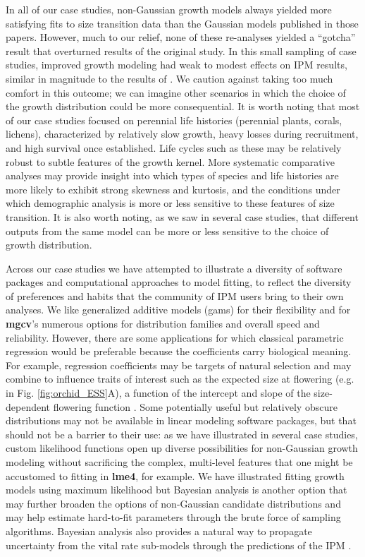 \documentclass[12pt]{article}
\begin{document}
In all of our case studies, non-Gaussian growth models always yielded more satisfying fits to size transition data than the Gaussian models published in those papers. 
However, much to our relief, none of these re-analyses yielded a ``gotcha'' result that overturned results of the original study. 
In this small sampling of case studies, improved growth modeling had weak to modest effects on IPM results, similar in magnitude to the results of \cite{peterson2019improving}. 
We caution against taking too much comfort in this outcome; we can imagine other scenarios in which the choice of the growth distribution could be more consequential. 
It is worth noting that most of our case studies focused on perennial life histories (perennial plants, corals, lichens), characterized by relatively slow growth, heavy losses during recruitment, and high survival once established. 
Life cycles such as these may be relatively robust to subtle features of the growth kernel. 
More systematic comparative analyses may provide insight into which types of species and life histories are more likely to exhibit strong skewness and kurtosis, and the conditions under which demographic analysis is more or less sensitive to these features of size transition. 
It is also worth noting, as we saw in several case studies, that different outputs from the same model can be more or less sensitive to the choice of growth distribution. 

Across our case studies we have attempted to illustrate a diversity of software packages and computational approaches to model fitting, to reflect the diversity of preferences and habits that the community of IPM users bring to their own analyses. 
We like generalized additive models (gams) for their flexibility and for \textbf{mgcv}'s numerous options for distribution families and overall speed and reliability. 
However, there are some applications for which classical parametric regression would be preferable because the coefficients carry biological meaning.
For example, regression coefficients may be targets of natural selection \citep{rees2016evolving} and may combine to influence traits of interest such as the expected size at flowering (e.g. in Fig. \ref{fig:orchid_ESS}A), a function of the intercept and slope of the size-dependent flowering function \citep{metcalf2003evolutionary}. 
Some potentially useful but relatively obscure distributions may not be available in linear modeling software packages, but that should not be a barrier to their use: as we have illustrated in several case studies, custom likelihood functions open up diverse possibilities for non-Gaussian growth modeling without sacrificing the complex, multi-level features that one might be accustomed to fitting in \textbf{lme4}, for example. 
We have illustrated fitting growth models using maximum likelihood but Bayesian analysis is another option that may further broaden the options of non-Gaussian candidate distributions and may help estimate hard-to-fit parameters through the brute force of sampling algorithms. 
Bayesian analysis also provides a natural way to propagate uncertainty from the vital rate sub-models through the predictions of the IPM \citep{elderd2016quantifying}. 
\end{document}
